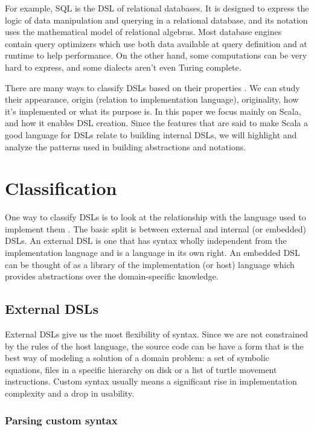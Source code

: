 For example, SQL is the DSL of relational databases.
It is designed to express the logic of data manipulation and querying in a relational database, and its notation uses the mathematical model of relational algebras.
Most database engines contain query optimizers which use both data available at query definition and at runtime to help performance.
On the other hand, some computations can be very hard to express, and some dialects aren't even Turing complete.

There are many ways to classify DSLs based on their properties \autocite{Gunther:2011}.
We can study their appearance, origin (relation to implementation language), originality, how it's implemented or what its purpose is.
In this paper we focus mainly on Scala, and how it enables DSL creation.
Since the features that are said to make Scala a good language for DSLs relate to building internal DSLs, we will highlight and analyze the patterns used in building abstractions and notations.

\section{Classification}
One way to classify DSLs is to look at the relationship with the language used to implement them \autocite{Artho:2015, Gunther:2011}.
The basic split is between external and internal (or embedded) DSLs.
An external DSL is one that has syntax wholly independent from the implementation language and is a language in its own right.
An embedded DSL can be thought of as a library of the implementation (or host) language which provides abstractions over the domain-specific knowledge.

\subsection{External DSLs}

External DSLs give us the most flexibility of syntax.
Since we are not constrained by the rules of the host language, the source code can be have a form that is the best way of modeling a solution of a domain problem: a set of symbolic equations, files in a specific hierarchy on disk or a list of turtle movement instructions.
Custom syntax usually means a significant rise in implementation complexity and a drop in usability.

\subsubsection{Parsing custom syntax}

